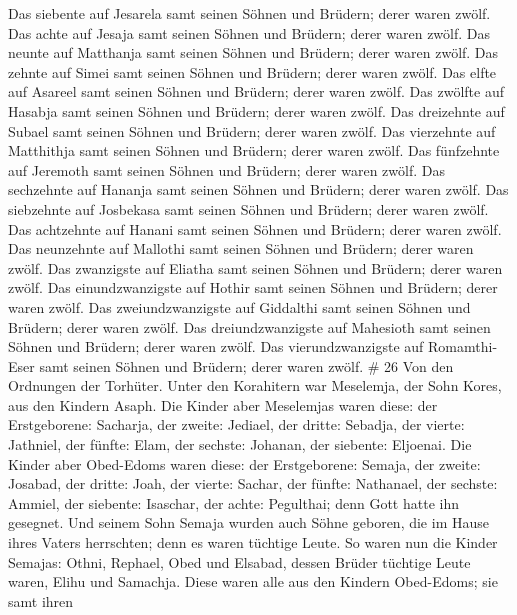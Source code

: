  Das siebente auf Jesarela samt seinen Söhnen und Brüdern;
derer waren zwölf.  Das achte auf Jesaja samt seinen Söhnen
und Brüdern; derer waren zwölf.  Das neunte auf Matthanja
samt seinen Söhnen und Brüdern; derer waren zwölf.  Das
zehnte auf Simei samt seinen Söhnen und Brüdern; derer waren zwölf.
 Das elfte auf Asareel samt seinen Söhnen und Brüdern;
derer waren zwölf.  Das zwölfte auf Hasabja samt seinen
Söhnen und Brüdern; derer waren zwölf.  Das dreizehnte auf
Subael samt seinen Söhnen und Brüdern; derer waren zwölf. 
Das vierzehnte auf Matthithja samt seinen Söhnen und Brüdern; derer
waren zwölf.  Das fünfzehnte auf Jeremoth samt seinen
Söhnen und Brüdern; derer waren zwölf.  Das sechzehnte auf
Hananja samt seinen Söhnen und Brüdern; derer waren zwölf. 
Das siebzehnte auf Josbekasa samt seinen Söhnen und Brüdern; derer waren
zwölf.  Das achtzehnte auf Hanani samt seinen Söhnen und
Brüdern; derer waren zwölf.  Das neunzehnte auf Mallothi
samt seinen Söhnen und Brüdern; derer waren zwölf.  Das
zwanzigste auf Eliatha samt seinen Söhnen und Brüdern; derer waren
zwölf.  Das einundzwanzigste auf Hothir samt seinen Söhnen
und Brüdern; derer waren zwölf.  Das zweiundzwanzigste auf
Giddalthi samt seinen Söhnen und Brüdern; derer waren zwölf.
 Das dreiundzwanzigste auf Mahesioth samt seinen Söhnen und
Brüdern; derer waren zwölf.  Das vierundzwanzigste auf
Romamthi-Eser samt seinen Söhnen und Brüdern; derer waren zwölf. \# 26
 Von den Ordnungen der Torhüter. Unter den Korahitern war
Meselemja, der Sohn Kores, aus den Kindern Asaph.  Die
Kinder aber Meselemjas waren diese: der Erstgeborene: Sacharja, der
zweite: Jediael, der dritte: Sebadja, der vierte: Jathniel, 
der fünfte: Elam, der sechste: Johanan, der siebente: Eljoenai.
 Die Kinder aber Obed-Edoms waren diese: der Erstgeborene:
Semaja, der zweite: Josabad, der dritte: Joah, der vierte: Sachar, der
fünfte: Nathanael,  der sechste: Ammiel, der siebente:
Isaschar, der achte: Pegulthai; denn Gott hatte ihn gesegnet.
 Und seinem Sohn Semaja wurden auch Söhne geboren, die im
Hause ihres Vaters herrschten; denn es waren tüchtige Leute.
 So waren nun die Kinder Semajas: Othni, Rephael, Obed und
Elsabad, dessen Brüder tüchtige Leute waren, Elihu und Samachja.
 Diese waren alle aus den Kindern Obed-Edoms; sie samt ihren
